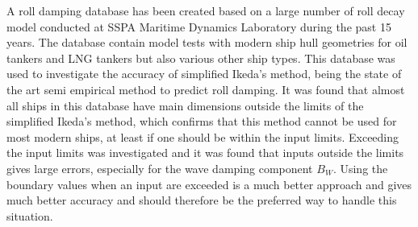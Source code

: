 A roll damping database has been created based on a large number of roll decay model conducted at SSPA Maritime Dynamics Laboratory during the past 15 years. The database contain model tests with modern ship hull geometries for oil tankers and LNG tankers but also various other ship types. This database was used to investigate the accuracy of simplified Ikeda's method, being the state of the art semi empirical method to predict roll damping. 
It was found that almost all ships in this database have main dimensions outside the limits of the simplified Ikeda's method, which confirms that this method cannot be used for most modern ships, at least if one should be within the input limits. Exceeding the input limits was investigated and it was found that inputs outside the limits gives large errors, especially for the wave damping component $B_W$. Using the boundary values when an input are exceeded is a much better approach and gives much better accuracy and should therefore be the preferred way to handle this situation.


